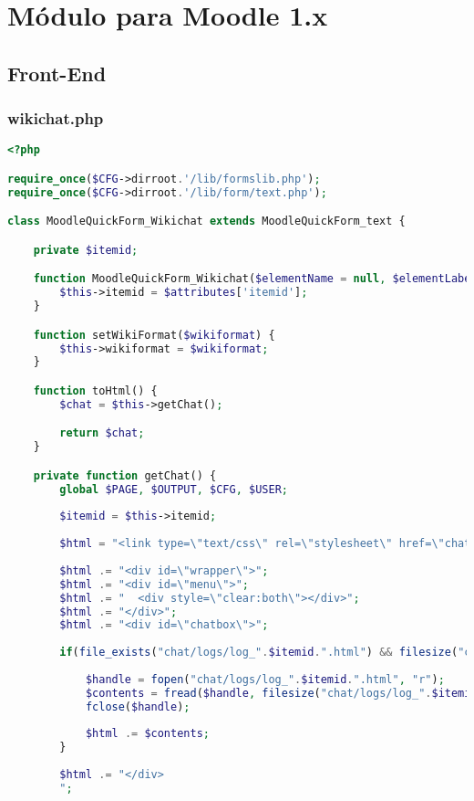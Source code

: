 \chapter[Módulo para Moodle 1.x]{\label{}
Módulo para Moodle 1.x}

\section{Front-End}

\subsection{wikichat.php}
\begin{lstlisting}[language=PHP]
<?php

require_once($CFG->dirroot.'/lib/formslib.php');
require_once($CFG->dirroot.'/lib/form/text.php');

class MoodleQuickForm_Wikichat extends MoodleQuickForm_text {

    private $itemid;

    function MoodleQuickForm_Wikichat($elementName = null, $elementLabel = null, $attributes = null) {	
		$this->itemid = $attributes['itemid'];		
    }

    function setWikiFormat($wikiformat) {
        $this->wikiformat = $wikiformat;
    }

    function toHtml() {
        $chat = $this->getChat();

        return $chat;
    }

    private function getChat() {
    	global $PAGE, $OUTPUT, $CFG, $USER;
		
	    $itemid = $this->itemid;
		
	    $html = "<link type=\"text/css\" rel=\"stylesheet\" href=\"chat/style.css\" />";
		
	    $html .= "<div id=\"wrapper\">";
	    $html .= "<div id=\"menu\">";
	    $html .= "	<div style=\"clear:both\"></div>";
	    $html .= "</div>";	
	    $html .= "<div id=\"chatbox\">";
	    
	    if(file_exists("chat/logs/log_".$itemid.".html") && filesize("chat/logs/log_".$itemid.".html") > 0){
	
			$handle = fopen("chat/logs/log_".$itemid.".html", "r");
			$contents = fread($handle, filesize("chat/logs/log_".$itemid.".html"));
			fclose($handle);
		
			$html .= $contents;
	    }
	
		$html .= "</div>
		";


\end{lstlisting}

